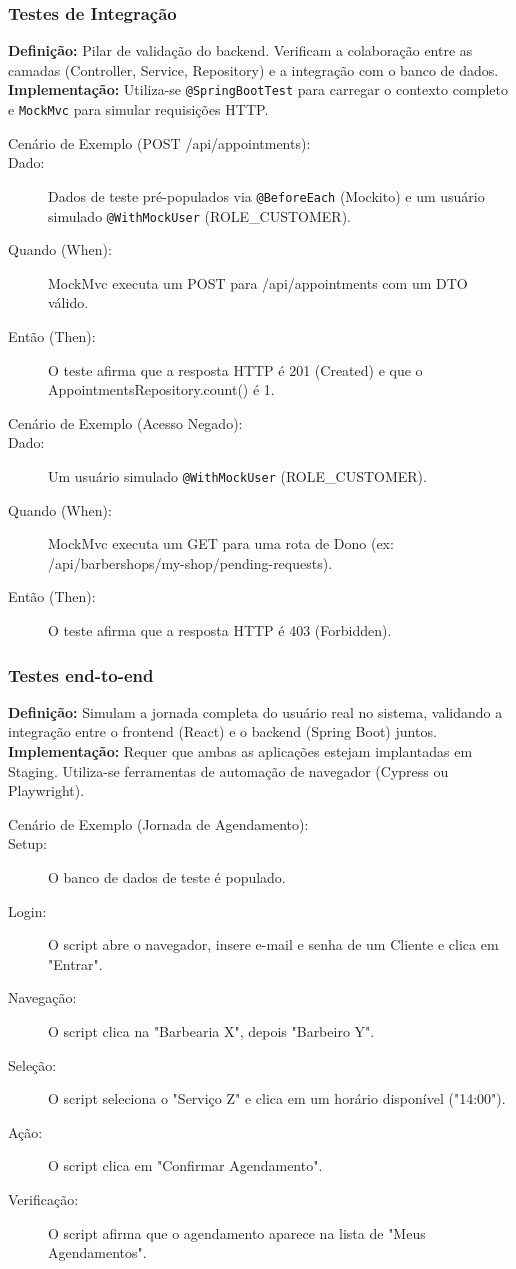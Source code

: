 \documentclass[
    12pt, 
    a4paper, 
    oneside, 
    chapter=TITLE, 
    section=TITLE
]{abntex2}
\begin{document}
\subsubsection{Testes de Integração}
\textbf{Definição:} Pilar de validação do backend. Verificam a colaboração entre as camadas (Controller, Service, Repository) e a integração com o banco de dados.
\textbf{Implementação:} Utiliza-se \texttt{@SpringBootTest} para carregar o contexto completo e \texttt{MockMvc} para simular requisições HTTP.
\begin{description}
    \item[Cenário de Exemplo (POST /api/appointments):]
    \item[Dado:] Dados de teste pré-populados via \texttt{@BeforeEach} (Mockito) e um usuário simulado \texttt{@WithMockUser} (ROLE\_CUSTOMER).
    \item[Quando (When):] MockMvc executa um POST para /api/appointments com um DTO válido.
    \item[Então (Then):] O teste afirma que a resposta HTTP é 201 (Created) e que o AppointmentsRepository.count() é 1.
    \item[Cenário de Exemplo (Acesso Negado):]
    \item[Dado:] Um usuário simulado \texttt{@WithMockUser} (ROLE\_CUSTOMER).
    \item[Quando (When):] MockMvc executa um GET para uma rota de Dono (ex: /api/barbershops/my-shop/pending-requests).
    \item[Então (Then):] O teste afirma que a resposta HTTP é 403 (Forbidden).
\end{description}

\subsubsection{Testes end-to-end}
\textbf{Definição:} Simulam a jornada completa do usuário real no sistema, validando a integração entre o frontend (React) e o backend (Spring Boot) juntos.
\textbf{Implementação:} Requer que ambas as aplicações estejam implantadas em Staging. Utiliza-se ferramentas de automação de navegador (Cypress ou Playwright).
\begin{description}
    \item[Cenário de Exemplo (Jornada de Agendamento):]
    \item[Setup:] O banco de dados de teste é populado.
    \item[Login:] O script abre o navegador, insere e-mail e senha de um Cliente e clica em "Entrar".
    \item[Navegação:] O script clica na "Barbearia X", depois "Barbeiro Y".
    \item[Seleção:] O script seleciona o "Serviço Z" e clica em um horário disponível ("14:00").
    \item[Ação:] O script clica em "Confirmar Agendamento".
    \item[Verificação:] O script afirma que o agendamento aparece na lista de "Meus Agendamentos".
\end{description}
\end{document}
